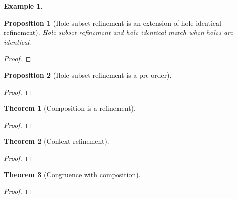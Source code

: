 \documentclass{article}
\theoremstyle{plain}
\newtheorem{thm}{Theorem}
\newtheorem{prop}{Proposition}
\theoremstyle{definition}
\newtheorem{exi}{Example}
\begin{document}
\begin{exi} %
\end{exi}

\begin{prop}[Hole-subset refinement is an extension of hole-identical refinement]
Hole-subset refinement and hole-identical match when holes are identical.
\end{prop}
\begin{proof}
\end{proof}
\begin{prop}[Hole-subset refinement is a pre-order]
\end{prop}
\begin{proof}
\end{proof}
\begin{thm}[Composition is a refinement]
\end{thm}
\begin{proof}
\end{proof}
\begin{thm}[Context refinement]
\end{thm}
\begin{proof}
\end{proof}
\begin{thm}[Congruence with composition]
\end{thm}
\begin{proof}
\end{proof}
\end{document}
